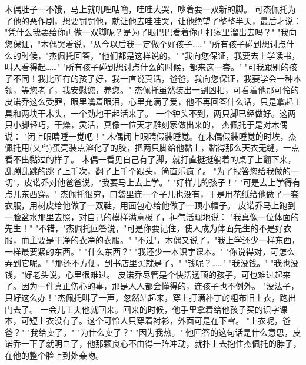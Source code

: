 \documentclass[12pt,UTF8]{ctexbook}
\begin{document}
\chapter{}

木偶肚子一不饿，马上就叽哩咕噜，哇哇大哭，吵着要一双新的脚。
可杰佩托为了他的恶作剧，想要罚罚他，就让他去哇哇哭，让他绝望了整整半天，最后才说：
"凭什么我要给你再做一双脚呢？是为了眼巴巴看着你再打家里溜出去吗？"
"我向您保证，"木偶哭着说，"从今以后我一定做个好孩子……"
"所有孩子碰到想讨点什么的时候，"杰佩托回答，"他们都是这样说的。"
"我向您保证，我要去上学读书，叫人看得起……"
"所有孩子碰到想讨点什么的时候，都来这一套。"
"可我跟别的孩子不同！我比所有的孩子好，我一直说真话，爸爸，我向您保证，我要学会一种本领，等您老了，我安慰您，养您。"
杰佩托虽然装出一副凶相，可看着他那可怜的皮诺乔这么受罪，眼里噙着眼泪，心里充满了爱，他不再回答什么话，只是拿起工具和两块干木头，一个劲地干起活来了。
一个钟头不到，两只脚已经做好。这两只小脚轻巧，干燥，灵活，真像一位天才雕刻家做出来的，
杰佩托于是对木偶说：
"闭上眼睛睡一觉吧！"
木偶闭上眼睛假装睡觉。在木偶假装睡觉的时埃，杰佩托用(又鸟)蛋壳装点溶化了的胶，把两只脚给他黏上，黏得那么天衣无缝，一点看不出黏过的样子。
木偶一看见自己有了脚，就打直挺挺躺着的桌子上翻下来，乱蹦乱跳的跳了上千次，翻了上千个跟头，简直乐疯了。
"为了报答您给我做的一切"，皮诺乔对他爸爸说，"我要马上去上学。"
"好样儿的孩子！"
"可是去上学得有点儿东西穿。"
杰佩托很穷，口袋里连一个子儿也没有，于是用花纸给他做了一套衣服，用树皮给他做了一双鞋，用面包心给他做了一顶小帽子。
皮诺乔马上跑到一脸盆水那里去照，对自己的模样满意极了，神气活现地说：
"我真像一位体面的先生！"
"不错，"杰佩托回答说，"可是你要记住，使人成为体面先生的不是好衣服，而主要是干净的衣净的衣服。"
"不过"，木偶又说了，"我上学还少一样东西，一样最要紧的东西。"
"什么东西？"
"我还少一本识字课本。"
"你说得对，可怎么弄到它呢。"
"那还不方便，到书店里买就是了。"
"钱呢？……"
"我没钱。"
"我也没钱，"好老头说，心里很难过。
皮诺乔尽管是个快活透顶的孩子，可也难过起来了。因为一件真正伤心的事，那是人人都会懂得的，连孩子也不例外。
"没法子，只好这么办！"杰佩托叫了一声，忽然站起来，穿上打满补丁的粗布旧上衣，跑出门去了。
一会儿工夫他就回来。回来的时候，他手里拿着给他孩子买的识字课本，可短上衣没有了。这个可怜人只穿着衬衫，外面可是在下雪。
"上衣呢，爸爸？"
"我给卖了。"
"为什么卖了？"
"因为我热。"
他回答的这句话是什么意思，皮诺乔一下子就明白了，他那颗良心不由得一阵冲动，就扑上去抱住杰佩托的脖子，在他的整个脸上到处亲吻。

\chapter{}
\end{document}
